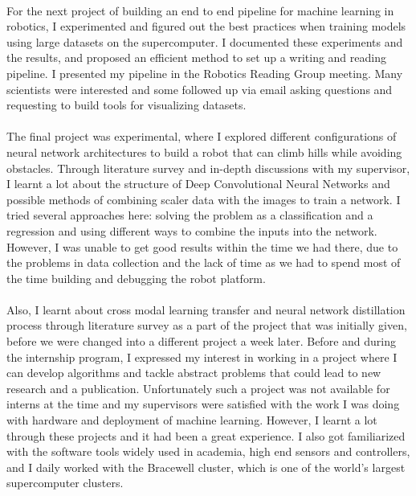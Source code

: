 \paragraph{}
For the next project of building an end to end pipeline for machine learning in robotics, I experimented and figured out the best practices when training models using large datasets on the supercomputer. I documented these experiments and the results, and proposed an efficient method to set up a writing and reading pipeline. I presented my pipeline in the Robotics Reading Group meeting. Many scientists were interested and some followed up via email asking questions and requesting to build tools for visualizing datasets.

\paragraph{}
The final project was experimental, where I explored different configurations of neural network architectures to build a robot that can climb hills while avoiding obstacles. Through literature survey and in-depth discussions with my supervisor, I learnt a lot about the structure of Deep Convolutional Neural Networks and possible methods of combining scaler data with the images to train a network. I tried several approaches here: solving the problem as a classification and a regression and using different ways to combine the inputs into the network. However, I was unable to get good results within the time we had there, due to the problems in data collection and the lack of time as we had to spend most of the time building and debugging the robot platform.

\paragraph{}
Also, I learnt about cross modal learning transfer and neural network distillation process through literature survey as a part of the project that was initially given, before we were changed into a different project a week later. Before and during the internship program, I expressed my interest in working in a project where I can develop algorithms and tackle abstract problems that could lead to new research and a publication. Unfortunately such a project was not available for interns at the time and my supervisors were satisfied with the work I was doing with hardware and deployment of machine learning. However, I learnt a lot through these projects and it had been a great experience. I also got familiarized with the software tools widely used in academia, high end sensors and controllers, and I daily worked with the Bracewell cluster, which is one of the world's largest supercomputer clusters. 

